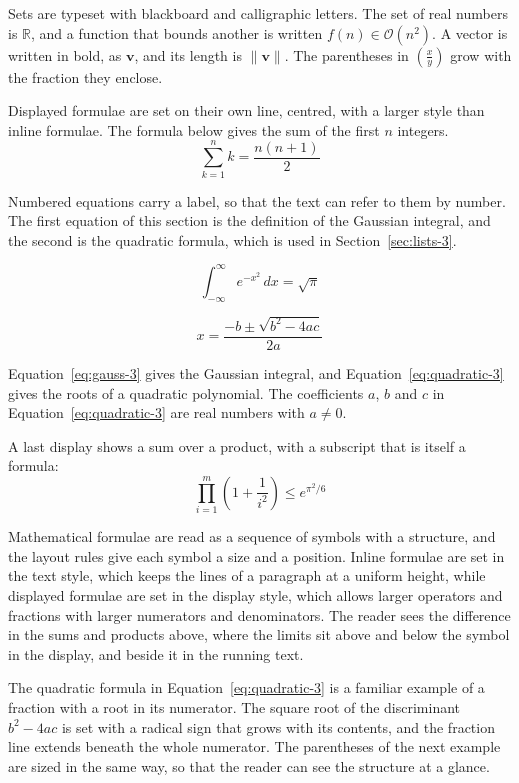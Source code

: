 \documentclass{article}
\begin{document}
Sets are typeset with blackboard and calligraphic letters. The set of real numbers is
$\mathbb{R}$, and a function that bounds another is written $f(n) \in \mathcal{O}(n^2)$.
A vector is written in bold, as $\mathbf{v}$, and its length is $\|\mathbf{v}\|$. The
parentheses in $\left( \frac{x}{y} \right)$ grow with the fraction they enclose.

Displayed formulae are set on their own line, centred, with a larger style than inline
formulae. The formula below gives the sum of the first $n$ integers.
\[
  \sum_{k=1}^{n} k = \frac{n(n+1)}{2}
\]

Numbered equations carry a label, so that the text can refer to them by number. The
first equation of this section is the definition of the Gaussian integral, and the
second is the quadratic formula, which is used in Section~\ref{sec:lists-3}.

\begin{equation}\label{eq:gauss-3}
  \int_{-\infty}^{\infty} e^{-x^{2}}\,dx = \sqrt{\pi}
\end{equation}

\begin{equation}\label{eq:quadratic-3}
  x = \frac{-b \pm \sqrt{b^{2}-4ac}}{2a}
\end{equation}

Equation~\ref{eq:gauss-3} gives the Gaussian integral, and
Equation~\ref{eq:quadratic-3} gives the roots of a quadratic polynomial. The coefficients
$a$, $b$ and $c$ in Equation~\ref{eq:quadratic-3} are real numbers with $a \neq 0$.

A last display shows a sum over a product, with a subscript that is itself a formula:
\[
  \prod_{i=1}^{m} \left( 1 + \frac{1}{i^{2}} \right) \leq e^{\pi^{2}/6}
\]

Mathematical formulae are read as a sequence of symbols with a structure, and the layout
rules give each symbol a size and a position. Inline formulae are set in the text style,
which keeps the lines of a paragraph at a uniform height, while displayed formulae are
set in the display style, which allows larger operators and fractions with larger
numerators and denominators. The reader sees the difference in the sums and products
above, where the limits sit above and below the symbol in the display, and beside it in
the running text.

The quadratic formula in Equation~\ref{eq:quadratic-3} is a familiar example of a
fraction with a root in its numerator. The square root of the discriminant
$b^{2}-4ac$ is set with a radical sign that grows with its contents, and the
fraction line extends beneath the whole numerator. The parentheses of the next example
are sized in the same way, so that the reader can see the structure at a glance.
\end{document}
